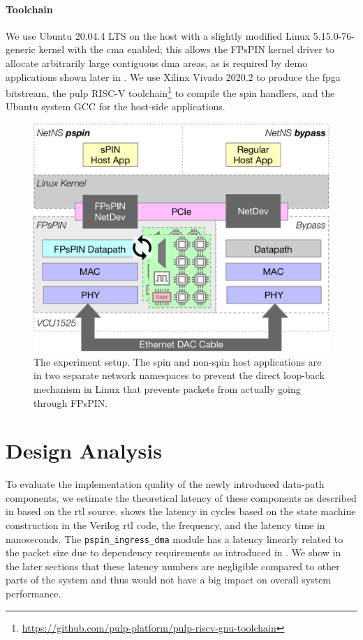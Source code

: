 \paragraph{Toolchain} We use Ubuntu 20.04.4 LTS on the host with a slightly modified Linux 5.15.0-76-generic kernel with the \ac{cma} enabled; this allows the FPsPIN kernel driver to allocate arbitrarily large contiguous \ac{dma} areas, as is required by demo applications shown later in .  We use Xilinx Vivado 2020.2 to produce the \ac{fpga} bitstream, the \ac{pulp} RISC-V toolchain\footnote{\url{https://github.com/pulp-platform/pulp-riscv-gnu-toolchain}} to compile the \ac{spin} handlers, and the Ubuntu system GCC for the host-side applications.

\begin{figure}
    \centering
    \includegraphics[width=.8\linewidth]{figures/experiment-setup.pdf}
    \caption{The experiment setup.  The \ac{spin} and non-\ac{spin} host applications are in two separate network namespaces to prevent the direct loop-back mechanism in Linux that prevents packets from actually going through FPsPIN.} \label{fig:experiment-setup}
\end{figure}

\section{Design Analysis} \label{sec:hw-analysis}

To evaluate the implementation quality of the newly introduced data-path components, we estimate the theoretical latency of these components as described in  based on the \ac{rtl} source.   shows the latency in cycles based on the state machine construction in the Verilog \ac{rtl} code, the frequency, and the latency time in nanoseconds. The \texttt{pspin\_ingress\_dma} module has a latency linearly related to the packet size due to dependency requirements as introduced in .  We show in the later sections that these latency numbers are negligible compared to other parts of the system and thus would not have a big impact on overall system performance.


